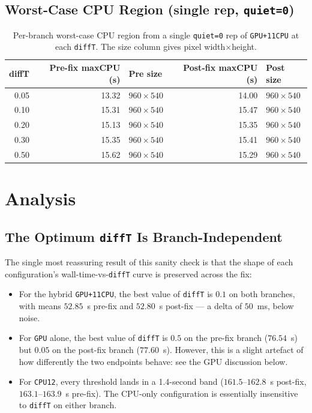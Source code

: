 \documentclass[
	english,
	letterpaper, oneside
]{article}
\begin{document}
\subsection{Worst-Case CPU Region (single rep, \texttt{quiet=0})}

\begin{table}[H]
    \centering
    \caption{Per-branch worst-case CPU region from a single
             \texttt{quiet=0} rep of \texttt{GPU+11CPU} at each
             \texttt{diffT}. The size column gives pixel width$\times$height.}
    \label{tab:worst}
    \begin{tabular}{rrlrl}
        \hline
        diffT & Pre-fix maxCPU (s) & Pre size & Post-fix maxCPU (s) & Post size \\
        \hline
        0.05 & 13.32 & $960\times540$ & 14.00 & $960\times540$ \\
        0.10 & 15.31 & $960\times540$ & 15.47 & $960\times540$ \\
        0.20 & 15.13 & $960\times540$ & 15.35 & $960\times540$ \\
        0.30 & 15.35 & $960\times540$ & 15.41 & $960\times540$ \\
        0.50 & 15.62 & $960\times540$ & 15.29 & $960\times540$ \\
        \hline
    \end{tabular}
\end{table}

\section{Analysis}

\subsection{The Optimum \texttt{diffT} Is Branch-Independent}

The single most reassuring result of this sanity check is that the
shape of each configuration's wall-time-vs-\texttt{diffT} curve is
preserved across the fix:

\begin{itemize}
    \item For the hybrid \texttt{GPU+11CPU}, the best value of
    \texttt{diffT} is $0.1$ on both branches, with means
    $52.85$~s pre-fix and $52.80$~s post-fix --- a delta of $50$~ms,
    below noise.
    \item For \texttt{GPU} alone, the best value of \texttt{diffT} is
    $0.5$ on the pre-fix branch ($76.54$~s) but $0.05$ on the post-fix
    branch ($77.60$~s). However, this is a slight artefact of how
    differently the two endpoints behave: see the GPU discussion below.
    \item For \texttt{CPU12}, every threshold lands in a 1.4-second
    band ($161.5$--$162.8$~s post-fix, $163.1$--$163.9$~s pre-fix).
    The CPU-only configuration is essentially insensitive to
    \texttt{diffT} on either branch.
\end{itemize}
\end{document}
